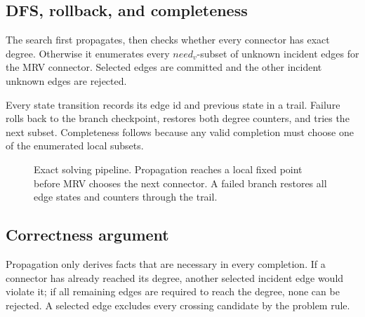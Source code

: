 \documentclass[11pt,a4paper,oneside]{article}
\begin{document}
\subsection{DFS, rollback, and completeness}

The search first propagates, then checks whether every connector has exact
degree. Otherwise it enumerates every $\mathit{need}_v$-subset of unknown
incident edges for the MRV connector. Selected edges are committed and the other
incident unknown edges are rejected.

Every state transition records its edge id and previous state in a trail. Failure
rolls back to the branch checkpoint, restores both degree counters, and tries the
next subset. Completeness follows because any valid completion must choose one
of the enumerated local subsets.

\begin{figure}[H]
\centering
{}
\caption{Exact solving pipeline. Propagation reaches a local fixed point before
MRV chooses the next connector. A failed branch restores all edge states and
counters through the trail.}
\label{fig:pipeline}
\end{figure}

\subsection{Correctness argument}

Propagation only derives facts that are necessary in every completion. If a
connector has already reached its degree, another selected incident edge would
violate it; if all remaining edges are required to reach the degree, none can be
rejected. A selected edge excludes every crossing candidate by the problem rule.
\end{document}
